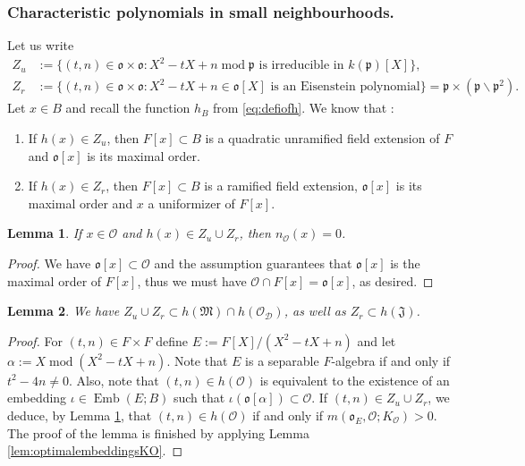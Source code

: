 \documentclass{article}
\newtheorem{lem}{Lemma}[section]
\theoremstyle{named}
\newcommand{\D}{\mathcal{D}}
\newcommand{\M}{\mathfrak{M}}
\newcommand{\J}{\mathfrak{J}}
\renewcommand{\O}{\mathcal{O}}
\renewcommand{\o}{\mathfrak{o}}
\newcommand{\p}{\mathfrak{p}}
\DeclareMathOperator{\modulo}{mod}
\DeclareMathOperator{\Emb}{Emb}
\begin{document}
\subsubsection{Characteristic polynomials in small neighbourhoods.}
Let us write
\begin{equation*}
\begin{aligned}
Z_u & := \{(t, n) \in \o\times \o: X^2 - tX + n \modulo \p \text{ is irreducible in }k(\p)[X] \},\\
Z_r & := \{(t, n) \in \o \times \o: X^2 - tX + n \in \o[X] \text{ is an Eisenstein polynomial}\} = \p \times (\p \smallsetminus \p^2).
\end{aligned}
\end{equation*}
Let $x \in B$ and recall the function $h_B$ from \eqref{eq:defiofh}. We know that \cite[Ch. I, §6]{serrelocalfields}: 
\begin{enumerate}
    \item [i)] If $h(x) \in Z_u$, then $F[x]\subset B$ is a quadratic unramified field extension of $F$ and $\o[x]$ is its maximal order. 
    \item [ii)] If $h(x) \in Z_r$, then $F[x]\subset B$ is a ramified field extension, $\o[x]$ is its maximal order and $x$ a uniformizer of $F[x]$.
\end{enumerate}
\begin{lem}\label{lem:certainelementsareoptimal}
If $x\in \O$ and $h(x) \in Z_u \cup Z_r$, then $n_\O(x) = 0$.
\end{lem}
\begin{proof}
We have $\o[x] \subset \O$ and the assumption guarantees that $\o[x]$ is the maximal order of $F[x]$, thus we must have $\O \cap F[x] = \o[x]$, as desired. 
\end{proof}

\begin{lem}\label{lem:imageofhhereditaryorders}
We have $Z_u \cup Z_r \subset h(\M)\cap h(\O_\D)$, as well as $Z_r \subset h(\J)$.
\end{lem}
\begin{proof}
For $(t, n) \in F \times F$ define $E := F[X]/(X^2 - tX + n)$ and let $\alpha := X \modulo (X^2 - tX + n)$. Note that $E$ is a separable $F$-algebra if and only if $t^2 - 4n \neq 0$. Also, note that $(t, n) \in h(\O)$ is equivalent to the existence of an embedding $\iota \in \Emb(E; B)$ such that $\iota(\o[\alpha])\subset \O$. If $(t, n) \in Z_u \cup Z_r$, we deduce, by Lemma \ref{lem:certainelementsareoptimal}, that $(t, n) \in h(\O)$ if and only if $m(\o_{E}, \O; K_\O) > 0$. The proof of the lemma is finished by applying Lemma \ref{lem:optimalembeddingsKO}.
\end{proof}
\end{document}
